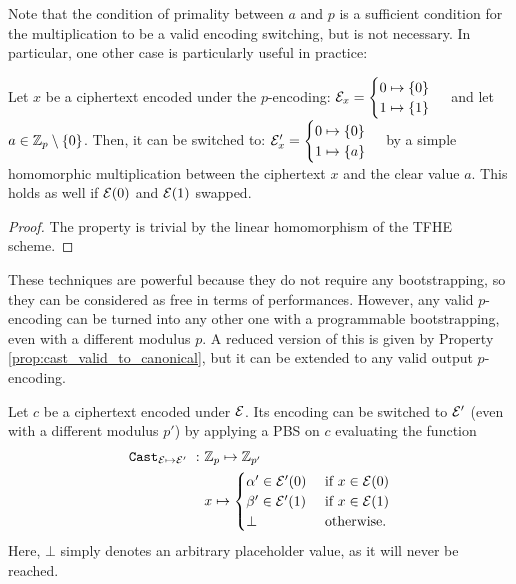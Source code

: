 Note that the condition of primality between $a$ and $p$ is a sufficient condition for the multiplication to be a valid encoding switching, but is not necessary. In particular, one other case is particularly useful in practice:

\begin{property}
\label{prop:mult_from_1}
    Let $x$ be a ciphertext encoded under the $p$-encoding: $\mathcal{E}_x = \begin{cases} 0 \mapsto \{0\} \\ 1 \mapsto \{1\} \end{cases}$ and let $a \in \mathbb{Z}_p \setminus \{0\}$. Then, it can be switched to: $\mathcal{E}'_x = \begin{cases} 0 \mapsto \{0\} \\ 1 \mapsto \{a\} \end{cases}$ by a simple homomorphic multiplication between the ciphertext $x$ and the clear value $a$.
    This holds as well if $\mathcal{E}(0)$ and $\mathcal{E}(1)$ swapped.
\end{property}

\begin{proof}
    The property is trivial by the linear homomorphism of the TFHE scheme.
\end{proof} 

These techniques are powerful because they do not require any bootstrapping, so they can be considered as free in terms of performances. However, any valid $p$-encoding can be turned into any other one with a programmable bootstrapping, even with a different modulus $p$. A reduced version of this is given by Property \ref{prop:cast_valid_to_canonical}, but it can be extended to any valid output $p$-encoding.

\begin{property} 
    Let $c$ be a ciphertext encoded under $\mathcal{E}$. Its encoding can be switched to $\mathcal{E}'$ (even with a different modulus $p'$) by applying a PBS on $c$ evaluating the function     \begin{align}
        \texttt{Cast}_{\mathcal{E} \mapsto \mathcal{E}'}~:~& \mathbb{Z}_p \mapsto \mathbb{Z}_{p'}\\
        & x \mapsto \begin{cases}
                        \alpha' \in \mathcal{E}'(0) & \text{ if } x \in \mathcal{E}(0)\\
                        \beta' \in \mathcal{E}'(1) & \text{ if } x \in \mathcal{E}(1)\\
                        \bot & \text{ otherwise.}
                    \end{cases}
    \end{align}
    Here, $\bot$ simply denotes an arbitrary placeholder value, as it will never be reached.
    \label{prop:enc_switch_pbs}
\end{property} 




